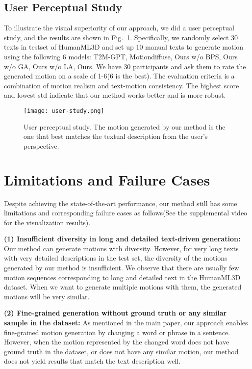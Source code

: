 \documentclass[10pt,twocolumn,letterpaper]{article}
\begin{document}
\subsection{User Perceptual Study}
To illustrate the visual superiority of our approach, we did a user perceptual study, and the results are shown in Fig.~\ref{fig:userstudy}. Specifically, we randomly select 30 texts in testset of HumanML3D and set up 10 manual texts to generate motion using the following 6 models: T2M-GPT, Motiondiffuse, Ours w/o BPS, Ours w/o GA, Ours w/o LA, Ours. We have 30 participants and ask them to rate the generated motion on a scale of 1-6(6 is the best). The evaluation criteria is a combination of motion realism and text-motion consistency. The highest score and lowest std indicate that our method works better and is more robust.






\begin{figure}[t]
\centering
\texttt{[image: user-study.png]}
\caption{User perceptual study. The motion generated by our method is the one that best matches the textual description from the user's perspective.} 
\label{fig:userstudy}
\end{figure}


\section{Limitations and Failure Cases}
Despite achieving the state-of-the-art performance, our method still has some limitations and corresponding failure cases as follows(See the supplemental video for the visualization results).

\textbf{(1) Insufficient diversity in long and detailed text-driven generation:} Our method can generate motions with diversity. However, for very long texts with very detailed descriptions in the test set, the diversity of the motions generated by our method is insufficient. We observe that there are usually few motion sequences corresponding to long and detailed text in the HumanML3D dataset. When we want to generate multiple motions with them, the generated motions will be very similar. 

\textbf{(2) Fine-grained generation without ground truth or any similar sample in the dataset:} As mentioned in the main paper, our approach enables fine-grained motion generation by changing a word or phrase in a sentence. However, when the motion represented by the changed word does not have ground truth in the dataset, or does not have any similar motion, our method does not yield results that match the text description well. 
\end{document}
